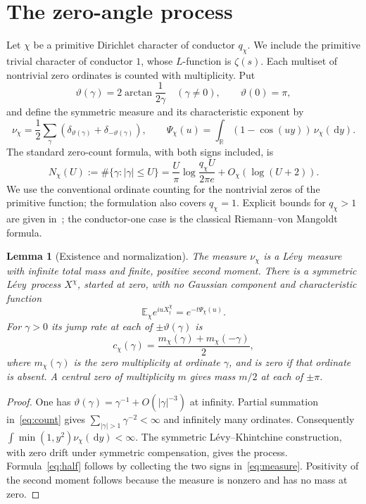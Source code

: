\documentclass[11pt]{article}
\newtheorem{lemma}[theorem]{Lemma}
\theoremstyle{definition}
\newcommand{\R}{\mathbb R}
\newcommand{\E}{\mathbb E}
\newcommand{\Levy}{L\'evy}
\newcommand{\dd}{\,\mathrm d}
\newcommand{\abs}[1]{\left|#1\right|}
\newcommand{\angles}{\vartheta}
\begin{document}
\section{The zero-angle process}
\label{sec:process}

Let $\chi$ be a primitive Dirichlet character of conductor $q_\chi$. We include
the primitive trivial character of conductor $1$, whose $L$-function is
$\zeta(s)$. Each multiset of nontrivial zero ordinates is counted with
multiplicity. Put
\begin{equation}\label{eq:angle}
 \angles(\gamma)=2\arctan\frac1{2\gamma}\quad(\gamma\ne0),
 \qquad \angles(0)=\pi,
\end{equation}
and define the symmetric measure and its characteristic exponent by
\begin{equation}\label{eq:measure}
 \nu_\chi=\frac12\sum_\gamma
  (\delta_{\angles(\gamma)}+\delta_{-\angles(\gamma)}),
 \qquad
 \Psi_\chi(u)=\int_\R(1-\cos(uy))\,\nu_\chi(\dd y).
\end{equation}
The standard zero-count formula, with both signs included, is
\begin{equation}\label{eq:count}
 N_\chi(U):=\#\{\gamma:\abs\gamma\le U\}
 =\frac U\pi\log\frac{q_\chi U}{2\pi e}+O_\chi(\log(U+2)).
\end{equation}
We use the conventional ordinate counting for the nontrivial zeros of the
primitive function; the formulation also covers $q_\chi=1$. Explicit bounds
for $q_\chi>1$ are given in~\cite{BennettEtAl}; the conductor-one case is the
classical Riemann--von Mangoldt formula.

\begin{lemma}[Existence and normalization]\label{lem:exist}
The measure $\nu_\chi$ is a \Levy\ measure with infinite total mass and finite,
positive second moment. There is a symmetric \Levy\ process $X^\chi$, started
at zero, with no Gaussian component and characteristic function
\[
 \E_\chi e^{iuX^\chi_t}=e^{-t\Psi_\chi(u)}.
\]
For $\gamma>0$ its jump rate at each of
$\pm\angles(\gamma)$ is
\begin{equation}\label{eq:half}
 c_\chi(\gamma)
 =\frac{m_\chi(\gamma)+m_\chi(-\gamma)}2,
\end{equation}
where $m_\chi(\gamma)$ is the zero multiplicity at ordinate $\gamma$, and is
zero if that ordinate is absent. A central zero of multiplicity $m$ gives mass
$m/2$ at each of $\pm\pi$.
\end{lemma}

\begin{proof}
One has $\angles(\gamma)=\gamma^{-1}+O(\abs\gamma^{-3})$ at infinity.
Partial summation in~\eqref{eq:count} gives
$\sum_{\abs\gamma>1}\gamma^{-2}<\infty$ and infinitely many ordinates.
Consequently $\int\min(1,y^2)\nu_\chi(\dd y)<\infty$. The symmetric
\Levy--Khintchine construction, with zero drift under symmetric compensation,
gives the process. Formula~\eqref{eq:half} follows by collecting the two signs
in~\eqref{eq:measure}. Positivity of the second moment follows because the
measure is nonzero and has no mass at zero.
\end{proof}
\end{document}
